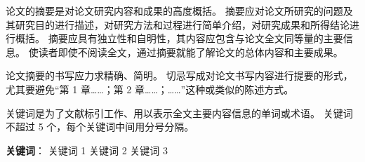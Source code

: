 
\newpage
\begin{center}
    \fontsize{18}{1}
\end{center}
\begin{tcolorbox}
\begin{center}
    \fontsize{16}{0}
\end{center}
\vspace{8mm}
\noindent
{\fontsize{16}{0}}
\vspace{2mm}

\setlength{\parindent}{24pt}
  论文的摘要是对论文研究内容和成果的高度概括。
  摘要应对论文所研究的问题及其研究目的进行描述，对研究方法和过程进行简单介绍，对研究成果和所得结论进行概括。
  摘要应具有独立性和自明性，其内容应包含与论文全文同等量的主要信息。
  使读者即使不阅读全文，通过摘要就能了解论文的总体内容和主要成果。

  论文摘要的书写应力求精确、简明。
  切忌写成对论文书写内容进行提要的形式，尤其要避免“第 1 章……；第 2 章……；……”这种或类似的陈述方式。

  关键词是为了文献标引工作、用以表示全文主要内容信息的单词或术语。
  关键词不超过 5 个，每个关键词中间用分号分隔。
\vspace{8mm}

\noindent\textbf{关键词}： \quad 关键词 1 \quad 关键词 2 \quad 关键词 3
\end{tcolorbox}


